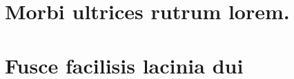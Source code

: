 \begin{anexosenv}
	
	\partanexos
	
	\chapter{Morbi ultrices rutrum lorem.}
	\lipsum[30]
	
	\chapter{Fusce facilisis lacinia dui}
	
	\lipsum[32]
	
\end{anexosenv}
